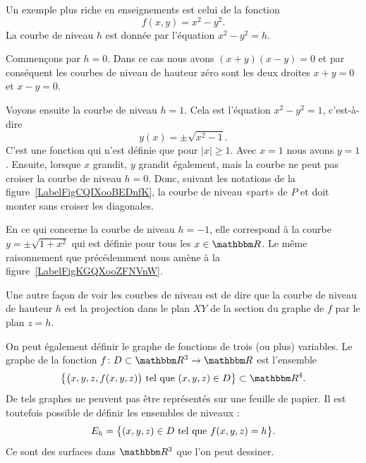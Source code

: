 \begin{example}
    Un exemple plus riche en enseignements est celui de la fonction
    \begin{equation}
        f(x,y)=x^2-y^2.
    \end{equation}
    La courbe de niveau $h$ est donnée par l'équation $x^2-y^2=h$.

    Commençons par $h=0$. Dans ce cas nous avons $(x+y)(x-y)=0$ et par conséquent les courbes de niveau de hauteur zéro sont les deux droites $x+y=0$ et $x-y=0$.

    Voyons ensuite la courbe de niveau $h=1$. Cela est l'équation $x^2-y^2=1$, c'est-à-dire
    \begin{equation}
        y(x)=\pm\sqrt{x^2-1}.
    \end{equation}
    C'est une fonction qui n'est définie que pour $| x |\geq 1$. Avec $x=1$ nous avons $y=1$. Ensuite, lorsque $x$ grandit, $y$ grandit également, mais la courbe ne peut pas croiser la courbe de niveau $h=0$. Donc, suivant les notations de la figure~\ref{LabelFigCQIXooBEDnfK}, la courbe de niveau «part» de $P$ et doit monter sans croiser les diagonales.


\newcommand{\CaptionFigCQIXooBEDnfK}{La courbe de niveau $h=1$ de $x^2-y^2$. Notez qu'elle est en deux morceaux.}


\newcommand{\CaptionFigKGQXooZFNVnW}{La courbe de niveau $x^2-y^2=-1$.}


    En ce qui concerne la courbe de niveau $h=-1$, elle correspond à la courbe $y=\pm\sqrt{1+x^2}$ qui est définie pour tous les $x\in\eR$. Le même raisonnement que précédemment nous amène à la figure~\ref{LabelFigKGQXooZFNVnW}.

\end{example}

Une autre façon de voir les courbes de niveau est de dire que la courbe de niveau de hauteur $h$ est la projection dans le plan $XY$ de la section du graphe de $f$ par le plan $z=h$.

On peut également définir le graphe de fonctions de trois (ou plus) variables. Le graphe de la fonction $f\colon D\subset\eR^3\to \eR$ est l'ensemble
\begin{equation}
    \big\{ \big( x,y,z,f(x,y,z) \big)\tq (x,y,z)\in D \big\}\subset \eR^4.
\end{equation}
De tels graphes ne peuvent pas être représentés sur une feuille de papier. Il est toutefois possible de définir les ensembles de niveaux :
\begin{equation}
    E_h=\big\{ (x,y,z)\in D\text{ tel que }  f(x,y,z)=h\big\}.
\end{equation}
Ce sont des surfaces dans $\eR^3$ que l'on peut dessiner.

